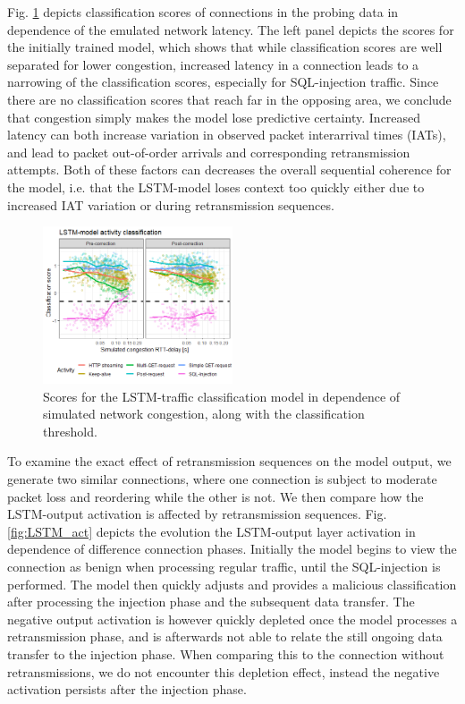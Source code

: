 \documentclass[conference]{IEEEtran}
\begin{document}
Fig. \ref{fig:LSTM_exp} depicts classification scores of connections in the probing data in dependence of the emulated network latency. The left panel depicts the scores for the initially trained model, which shows that while classification scores are well separated for lower congestion, increased latency in a connection leads to a narrowing of the classification scores, especially for SQL-injection traffic. Since there are no classification scores that reach far in the opposing area, we conclude that congestion simply makes the model lose predictive certainty. 
Increased latency can both increase variation in observed packet interarrival times (IATs), and lead to packet out-of-order arrivals and corresponding retransmission attempts. Both of these factors can decreases the overall sequential coherence for the model, i.e. that the LSTM-model loses context too quickly either due to increased IAT variation or during retransmission sequences. 


\begin{figure}
\centering
\includegraphics[width=0.5\textwidth]{images/LSTM_classi.png}
\caption{Scores for the LSTM-traffic classification model in dependence of simulated network congestion, along with the classification threshold. }\label{fig:LSTM_exp}
\end{figure}

To examine the exact effect of retransmission sequences on the model output, we generate two similar connections, where one connection is subject to moderate packet loss and reordering while the other is not. We then compare how the LSTM-output activation is affected by retransmission sequences. Fig. \ref{fig:LSTM_act} depicts the evolution the LSTM-output layer activation in dependence of difference connection phases. Initially the model begins to view the connection as benign when processing regular traffic, until the SQL-injection is performed. The model then quickly adjusts and provides a malicious classification after processing the injection phase and the subsequent data transfer. The negative output activation is however quickly depleted once the model processes a retransmission phase, and is afterwards not able to relate the still ongoing data transfer to the injection phase. When comparing this to the connection without retransmissions, we do not encounter this depletion effect, instead the negative activation persists after the injection phase.
\end{document}
